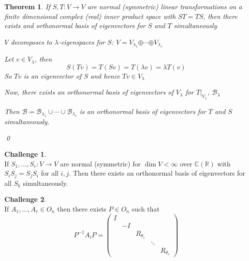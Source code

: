 \documentclass[11pt, a4paper]{report}
\makeatletter
\numberwithin{equation}{section}
\newcommand{\opl}{\boldsymbol{\oplus}}
\newcommand{\R}{\mathbb{R}}
\newcommand{\B}{\mathcal{B}}
\newcommand{\C}{\mathbb{C}}
\newcommand{\pmx}[1]{\begin{pmatrix}#1\end{pmatrix}}
\numberwithin{equation}{subsection}
\theoremstyle{plain}
\newtheorem{thm}{Theorem}[chapter] %
\theoremstyle{definition}
\newtheorem{ch}{Challenge}
\theoremstyle{remark}
\newtheorem*{prf}{Proof}
\renewenvironment{prf}[1][\proofname]{\par
  \vspace{-\topsep}%
  \normalfont
  \topsep0pt \partopsep0pt %
  \trivlist
  \item[\hskip\labelsep
        \itshape
    #1\@addpunct{.}]\ignorespaces
}{%
  \popQED\endtrivlist\@endpefalse
  \addvspace{6pt plus 6pt} %
}
\newcommand{\pr}[1]{\begin{adjustwidth}{1cm}{} \begin{prf} #1 \end{prf} \end{adjustwidth}}
\makeatother
\begin{document}
\begin{thm}
If $S,T : V \to V$ are normal (symmetric) linear transformations on a finite dimensional complex (real) inner product space with $ST = TS$, then there exists and orthonormal basis of eigenvectors for $S$ and $T$ simultaneously
\pr{
$V$ decomposes to $\lambda$-eigenspaces for $S$: $V = V_{\lambda_1} \opl \cdots \opl V_{\lambda_s}$

Let $v \in V_\lambda$, then $$S(Tv) = T(Sv) = T(\lambda v) = \lambda T(v)$$
So $Tv$ is an eigenvector of $S$ and hence $Tv \in V_\lambda$

Now, there exists an orthonormal basis of eigenvectors of $V_\lambda$ for $T|_{V_\lambda}$, $\B_\lambda$

Then $\B = \B_{\lambda_1} \cup \cdots \cup \B_{\lambda_s}$ is an orthonormal basis of eigenvectors for $T$ and $S$ simultaneously.
}\qed
\end{thm}

\begin{ch}${}$\\
If $S_1, \ldots, S_r : V \to V$ are normal (symmetric) for $\dim V < \infty$ over $\C (\R)$ with $S_i S_j = S_j S_i$ for all $i,j$. Then there exists an orthonormal basis of eigenvectors for all $S_k$ simultaneously.
\end{ch}

\begin{ch}${}$\\
If $A_1, \ldots, A_r \in O_n$ then there exists $P \in O_n$ such that $$P^{-1}A_iP = \pmx{I\\& -I\\&&R_{\theta_1}\\&&&\ddots\\&&&&R_{\theta_s}}$$
\end{ch}
\end{document}
